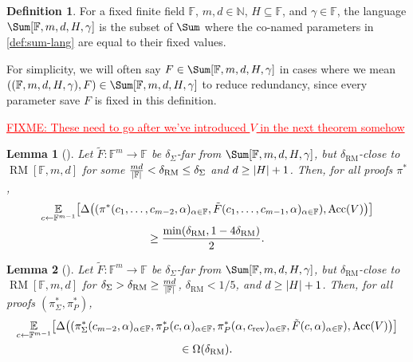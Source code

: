\documentclass[english,12pt]{reedthesis}
\theoremstyle{plain}
\newtheorem{lemma}[lemma]{Lemma}
\theoremstyle{definition}
\newtheorem{defn}[defn]{Definition}
\theoremstyle{remark}
\DeclareMathOperator{\Acc}{Acc}
\DeclareMathOperator{\rev}{rev}
\DeclareMathOperator{\RM}{RM}
\DeclarePairedDelimiter{\abs}{\lvert}{\rvert}
\newcommand{\FIXME}[1]{\textcolor{red}{\ul{FIXME: #1}}}
\begin{document}
\begin{defn}\label{def:sum-params}
  For a fixed finite field $\mathbb{F}$, $m, d \in \mathbb{N}$, $H \subseteq \mathbb{F}$, and
  $\gamma \in \mathbb{F}$, the language $\Sum[\mathbb{F}, m, d, H, \gamma]$ is the subset of
  $\Sum$ where the co-named parameters in \cref{def:sum-lang} are equal to their
  fixed values.
\end{defn}

For simplicity, we will often say $F \in \Sum[\mathbb{F}, m, d, H, \gamma]$ in cases
where we mean $((\mathbb{F}, m, d, H, \gamma), F) \in \Sum[\mathbb{F}, m, d, H, \gamma]$ to
reduce redundancy, since every parameter save $F$ is fixed in this definition.

\FIXME{These need to go after we've introduced $V$ in the next theorem somehow}

\begin{lemma}[{\cite[Lemma 4.4]{GOS25}}]\label{lem:sum-ev}
  Let $\tilde{F}\colon \mathbb{F}^{m} \rightarrow \mathbb{F}$ be $\delta_{\Sigma}$-far from
  $\Sum[\mathbb{F}, m, d, H, \gamma]$, but $\delta_{\RM}$-close to
  $\RM[\mathbb{F}, m, d]$ for some
  $\frac{md}{\abs{\mathbb{F}}} < \delta_{\RM} \le \delta_{\Sigma}$ and $d \ge \abs{H} + 1$. Then,
  for all proofs $\pi^{*}$,
  \begin{multline} %
    \underset{c \leftarrow \mathbb{F}^{m-1}}{\mathbb{E}}\mleft[
      \Delta\mleft(
        (\pi^{*}(c_{1}, \ldots, c_{m-2}, \alpha)_{\alpha \in \mathbb{F}}, \tilde{F}(c_{1}, \ldots, c_{m-1}, \alpha)_{\alpha \in \mathbb{F}}),
        \Acc(V)
      \mright)
    \mright] \\
    \ge \frac{\min(\delta_{\RM}, 1 - 4\delta_{\RM})}{2}.
  \end{multline}
\end{lemma}

\begin{lemma}[{\cite[Lemma 5.3]{GOS25}}]\label{lem:sum-ev-close}
  Let $\tilde{F}\colon \mathbb{F}^{m} \rightarrow \mathbb{F}$ be $\delta_{\Sigma}$-far from
  $\Sum[\mathbb{F}, m, d, H, \gamma]$, but $\delta_{\RM}$-close to $\RM[\mathbb{F}, m, d]$
  for $\delta_{\Sigma} > \delta_{\RM} \ge \frac{md}{\abs{\mathbb{F}}}$, $\delta_{\RM} < 1/5$, and
  $d \ge \abs{H} + 1$. Then, for all proofs $(\pi_{\Sigma}^{*}, \pi_{P}^{*})$,
  \begin{multline}
    \underset{c \leftarrow \mathbb{F}^{m-1}}{\mathbb{E}}\mleft[
      \Delta\mleft(
        (\pi_{\Sigma}^{*}(c_{m-2}, \alpha)_{\alpha \in \mathbb{F}}, \pi_{P}^{*}(c, \alpha)_{\alpha \in \mathbb{F}},
        \pi_{P}^{*}(\alpha, c_{\rev})_{\alpha \in \mathbb{F}}, \tilde{F}(c, \alpha)_{\alpha \in \mathbb{F}}),
        \Acc(V)
      \mright)
    \mright] \\
    \in \Omega(\delta_{\RM}).
  \end{multline}
\end{lemma}
\end{document}
